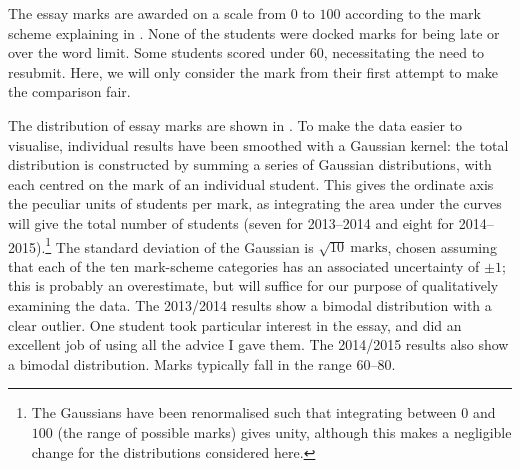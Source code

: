The essay marks are awarded on a scale from $0$ to $100$ according to the mark scheme explaining in . None of the students were docked marks for being late or over the word limit. Some students scored under $60$, necessitating the need to resubmit. Here, we will only consider the mark from their first attempt to make the comparison fair.

The distribution of essay marks are shown in . To make the data easier to visualise, individual results have been smoothed with a Gaussian kernel: the total distribution is constructed by summing a series of Gaussian distributions, with each centred on the mark of an individual student. This gives the ordinate axis the peculiar units of students per mark, as integrating the area under the curves will give the total number of students (seven for 2013--2014 and eight for 2014--2015).\footnote{The Gaussians have been renormalised such that integrating between $0$ and $100$ (the range of possible marks) gives unity, although this makes a negligible change for the distributions considered here.} The standard deviation of the Gaussian is $\sqrt{10}~\mathrm{marks}$, chosen assuming that each of the ten mark-scheme categories has an associated uncertainty of $\pm1$; this is probably an overestimate, but will suffice for our purpose of qualitatively examining the data. The 2013/2014 results show a bimodal distribution with a clear outlier. One student took particular interest in the essay, and did an excellent job of using all the advice I gave them. The 2014/2015 results also show a bimodal distribution. Marks typically fall in the range $60$--$80$.

